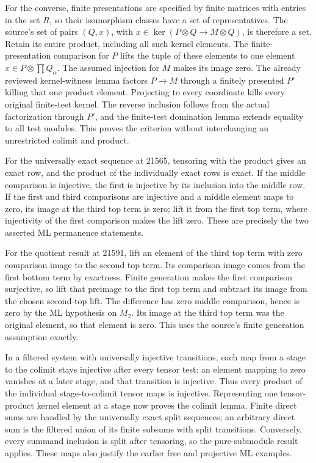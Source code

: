 For the converse, finite presentations are specified by finite matrices with entries in the set \(R\), so their isomorphism classes have a set of representatives. The source's set of pairs \((Q,x)\), with \(x\in\ker(P\otimes Q\to M\otimes Q)\), is therefore a set. Retain its entire product, including all such kernel elements. The finite-presentation comparison for \(P\) lifts the tuple of these elements to one element \(x\in P\otimes\prod Q_\alpha\). The assumed injection for \(M\) makes its image zero. The already reviewed kernel-witness lemma factors \(P\to M\) through a finitely presented \(P'\) killing that one product element. Projecting to every coordinate kills every original finite-test kernel. The reverse inclusion follows from the actual factorization through \(P'\), and the finite-test domination lemma extends equality to all test modules. This proves the criterion without interchanging an unrestricted colimit and product.

For the universally exact sequence at 21565, tensoring with the product gives an exact row, and the product of the individually exact rows is exact. If the middle comparison is injective, the first is injective by its inclusion into the middle row. If the first and third comparisons are injective and a middle element maps to zero, its image at the third top term is zero; lift it from the first top term, where injectivity of the first comparison makes the lift zero. These are precisely the two asserted ML permanence statements.

For the quotient result at 21591, lift an element of the third top term with zero comparison image to the second top term. Its comparison image comes from the first bottom term by exactness. Finite generation makes the first comparison surjective, so lift that preimage to the first top term and subtract its image from the chosen second-top lift. The difference has zero middle comparison, hence is zero by the ML hypothesis on \(M_2\). Its image at the third top term was the original element, so that element is zero. This uses the source's finite generation assumption exactly.

In a filtered system with universally injective transitions, each map from a stage to the colimit stays injective after every tensor test: an element mapping to zero vanishes at a later stage, and that transition is injective. Thus every product of the individual stage-to-colimit tensor maps is injective. Representing one tensor-product kernel element at a stage now proves the colimit lemma. Finite direct sums are handled by the universally exact split sequences; an arbitrary direct sum is the filtered union of its finite subsums with split transitions. Conversely, every summand inclusion is split after tensoring, so the pure-submodule result applies. These maps also justify the earlier free and projective ML examples.

